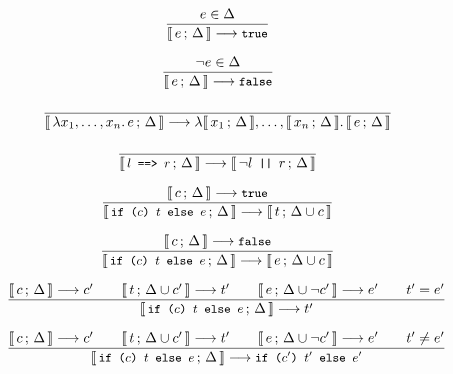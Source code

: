 \documentclass[a4paper,twoside]{article}
\newcommand{\lb}[2]{\llbracket\, #1\,;\, #2\, \rrbracket}
\newcommand{\stt}[1]{\texttt{\small{#1}}}
\begin{document}
\begin{figure}[htb]
\begin{framed}
 
\begin{equation}
\dfrac{
  e \in \Delta
}{
  \lb{e}{\Delta} \longrightarrow \stt{true}
}
\end{equation}

\begin{equation}
\dfrac{
  \neg e \in \Delta
}{
  \lb{e}{\Delta} \longrightarrow \stt{false}
}
\end{equation}

\begin{equation}
\dfrac{
  \empty
}{
  \lb{\lambda x_1, \ldots, x_n.\, e}{\Delta} \longrightarrow \lambda \lb{x_1}{\Delta}, \ldots, \lb{x_n}{\Delta}.\, \lb{e}{\Delta}
}
\end{equation}

\begin{equation}
\dfrac{
  \empty
}{
  \lb{\stt{$l$ ==> $r$}}{\Delta} \longrightarrow \lb{\neg l \stt{ || } r}{\Delta}
}
\end{equation}


\begin{equation}
\dfrac{
  \lb{c}{\Delta} \longrightarrow \stt{true}
}{
  \lb{\stt{if ($c$) $t$ else $e$}}{\Delta} \longrightarrow \lb{t}{\Delta \cup c}
}
\end{equation}

\begin{equation}
\dfrac{
  \lb{c}{\Delta} \longrightarrow \stt{false}
}{
  \lb{\stt{if ($c$) $t$ else $e$}}{\Delta} \longrightarrow \lb{e}{\Delta \cup c}
}
\end{equation}

\begin{equation}
\dfrac{
  \lb{c}{\Delta} \longrightarrow c' \qquad
  \lb{t}{\Delta \cup c'} \longrightarrow t' \qquad
  \lb{e}{\Delta \cup \neg c'} \longrightarrow e' \qquad
  t' = e'
}{
  \lb{\stt{if ($c$) $t$ else $e$}}{\Delta} \longrightarrow t'
}
\end{equation}

\begin{equation}
\dfrac{
  \lb{c}{\Delta} \longrightarrow c' \qquad
  \lb{t}{\Delta \cup c'} \longrightarrow t' \qquad
  \lb{e}{\Delta \cup \neg c'} \longrightarrow e' \qquad
  t' \not= e'
}{
  \lb{\stt{if ($c$) $t$ else $e$}}{\Delta} \longrightarrow \stt{if ($c'$) $t'$ else $e'$}
}
\end{equation}


\end{framed}
\end{figure}
\end{document}
